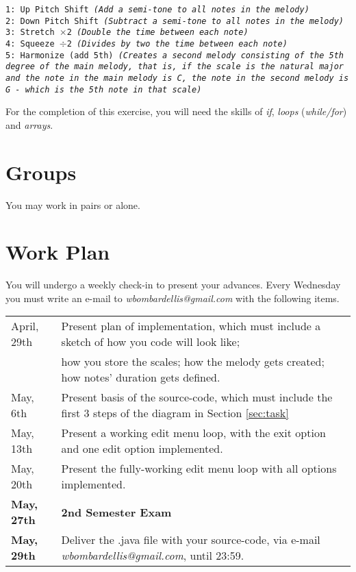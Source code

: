 \documentclass[a4paper]{article}
\begin{document}
	\texttt{1: Up Pitch Shift \emph{(Add a semi-tone to all notes in the melody)}\\
	2: Down Pitch Shift \emph{(Subtract a semi-tone to all notes in the melody)}\\
	3: Stretch $\times$2 \emph{(Double the time between each note)}\\
	4: Squeeze $\div$2 \emph{(Divides by two the time between each note)}\\
	5: Harmonize (add 5th) \emph{(Creates a second melody consisting of the 5th degree of the main melody, that is, if the scale is the natural major and the note in the main melody is C, the note in the second melody is G - which is the 5th note in that scale)}}

	For the completion of this exercise, you will need the skills of \emph{if}, \emph{loops} (\emph{while/for}) and \emph{arrays}.

	\section{Groups}
	You may work in pairs or alone.
	
	\section{Work Plan}
	You will undergo a weekly check-in to present your advances. Every Wednesday you must write an e-mail to \emph{wbombardellis@gmail.com} with the following items.
	
	\begin{tabular}{l | l}
		April, 29th			& Present plan of implementation, which must include a sketch of how you code will look like;\\
		& how you store the scales; how the melody gets created; how notes' duration gets defined.\\
		\hline
		May, 6th			& Present basis of the source-code, which must include the first 3 steps of the diagram in Section \ref{sec:task}\\
		\hline
		May, 13th			& Present a working edit menu loop, with the exit option and one edit option implemented.\\
		\hline
		May, 20th			& Present the fully-working edit menu loop with all options implemented.\\
		\hline
		\textbf{May, 27th}	& \textbf{2nd Semester Exam}\\
		\hline
		\textbf{May, 29th}	& Deliver the .java file with your source-code, via e-mail \emph{wbombardellis@gmail.com}, until 23:59.\\
	\end{tabular}
	
\end{document}
